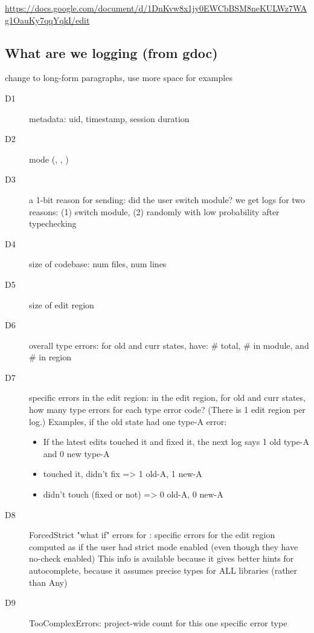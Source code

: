\documentclass[english,submission,cleveref]{programming}
\begin{document}

\url{https://docs.google.com/document/d/1DnKvw8x1jy0EWCbBSM8neKULWz7WAg1OauKy7qqYqkI/edit}


\subsection{What are we logging (from gdoc)}

\FILL{} change to long-form paragraphs, use more space for examples

\begin{description}
  \item[D1] metadata: uid, timestamp, session duration
  \item[D2] mode (\mnocheck{}, \mnonstrict{}, \mstrict{})
  \item[D3] a 1-bit reason for sending: did the user switch module?
    \subitem we get logs for two reasons: (1) switch module, (2) randomly with
    low probability after typechecking
  \item[D4] size of codebase: num files, num lines
  \item[D5] size of edit region
  \item[D6] overall type errors: for old and curr states, have: \# total, \# in module, and \# in region
  \item[D7] specific errors in the edit region: in the edit region, for old and
    curr states, how many type errors for each type error code? (There is 1
    edit region per log.)
    \subitem Examples, if the old state had one type-A error:
    \begin{itemize}
      \item If the latest edits touched it and fixed it, the next log says 1
        old type-A and 0 new type-A
      \item touched it, didn't fix => 1 old-A, 1 new-A
      \item didn't touch (fixed or not) => 0 old-A, 0 new-A
    \end{itemize}
  \item[D8] ForcedStrict "what if" errors for \mnocheck{}: specific errors for the
    edit region computed as if the user had strict mode enabled (even though they
    have no-check enabled)
    \subitem This info is available because it gives better hints for
    autocomplete, because it assumes precise types for ALL libraries (rather
    than Any)
  \item[D9] TooComplexErrors: project-wide count for this one specific error type
\end{description}
\end{document}
